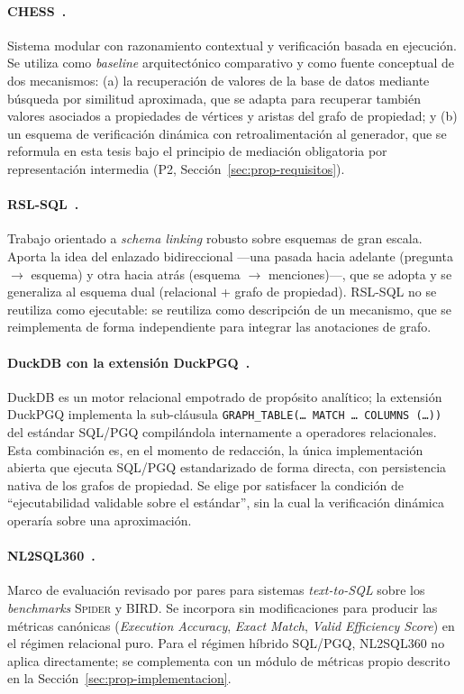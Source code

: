 \paragraph{CHESS~\cite{CHESS2024}.} Sistema modular con razonamiento contextual y verificación basada en ejecución. Se utiliza como \emph{baseline} arquitectónico comparativo y como fuente conceptual de dos mecanismos: (a) la recuperación de valores de la base de datos mediante búsqueda por similitud aproximada, que se adapta para recuperar también valores asociados a propiedades de vértices y aristas del grafo de propiedad; y (b) un esquema de verificación dinámica con retroalimentación al generador, que se reformula en esta tesis bajo el principio de mediación obligatoria por representación intermedia (P2, Sección~\ref{sec:prop-requisitos}).

\paragraph{RSL-SQL~\cite{RSL-SQL2024}.} Trabajo orientado a \emph{schema linking} robusto sobre esquemas de gran escala. Aporta la idea del enlazado bidireccional ---una pasada hacia adelante (pregunta $\to$ esquema) y otra hacia atrás (esquema $\to$ menciones)---, que se adopta y se generaliza al esquema dual (relacional + grafo de propiedad). RSL-SQL no se reutiliza como ejecutable: se reutiliza como descripción de un mecanismo, que se reimplementa de forma independiente para integrar las anotaciones de grafo.

\paragraph{DuckDB con la extensión DuckPGQ~\cite{DuckPGQ}.} DuckDB es un motor relacional empotrado de propósito analítico; la extensión DuckPGQ implementa la sub-cláusula \texttt{GRAPH\_TABLE(\ldots\ MATCH \ldots\ COLUMNS (\ldots))} del estándar \ac{SQL}/\ac{PGQ} compilándola internamente a operadores relacionales. Esta combinación es, en el momento de redacción, la única implementación abierta que ejecuta \ac{SQL}/\ac{PGQ} estandarizado de forma directa, con persistencia nativa de los grafos de propiedad. Se elige por satisfacer la condición de ``ejecutabilidad validable sobre el estándar'', sin la cual la verificación dinámica operaría sobre una aproximación.

\paragraph{NL2SQL360~\cite{SuperSQL2024}.} Marco de evaluación revisado por pares para sistemas \emph{text-to-SQL} sobre los \emph{benchmarks} \textsc{Spider} y \textsc{BIRD}. Se incorpora sin modificaciones para producir las métricas canónicas (\emph{Execution Accuracy}, \emph{Exact Match}, \emph{Valid Efficiency Score}) en el régimen relacional puro. Para el régimen híbrido \ac{SQL}/\ac{PGQ}, NL2SQL360 no aplica directamente; se complementa con un módulo de métricas propio descrito en la Sección~\ref{sec:prop-implementacion}.

